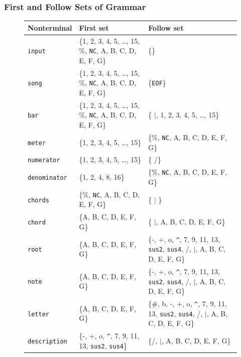 \documentclass{article}
\begin{document}
\subsubsection{First and Follow Sets of Grammar}
\begin{figure}[H]
    \def\arraystretch{1.5}%
    \begin{tabularx}{\textwidth}{l|X|X}
        Nonterminal & First set & Follow set \\
        \hline
        \hline
        \lstinline|input| & \{1, 2, 3, 4, 5, \ldots, 15, \%, \texttt{NC}, A, B, C, D, E, F, G\} & \{\}\\
        \hline
        \lstinline|song| & \{1, 2, 3, 4, 5, \ldots, 15, \%, \texttt{NC}, A, B, C, D, E, F, G\} & \{\texttt{EOF}\}\\
        \hline
        \lstinline|bar| & \{1, 2, 3, 4, 5, \ldots, 15, \%, \texttt{NC}, A, B, C, D, E, F, G\} & \{ $\vert$, 1, 2, 3, 4, 5, \ldots, 15\} \\
        \hline
        \lstinline|meter| &  \{1, 2, 3, 4, 5, \ldots, 15\} 
        & \{\%, \texttt{NC}, A, B, C, D, E, F, G\} \\
        \hline
        \lstinline|numerator| & \{1, 2, 3, 4, 5, \ldots, 15\} 
        & \{ /\}\\
        \hline
        \lstinline|denominator| & \{1, 2, 4, 8, 16\} 
        & \{\%, \texttt{NC}, A, B, C, D, E, F, G\} \\
        \hline
        \lstinline|chords| & \{\%, \texttt{NC}, A, B, C, D, E, F, G\}
        & \{ $\vert$ \} \\
        \hline
        \lstinline|chord| & \{A, B, C, D, E, F, G\}  & 
        \{ $\vert$, A, B, C, D, E, F, G\} \\
        \hline
        \lstinline|root| & \{A, B, C, D, E, F, G\} 
        & \{-, +, o, \lstinline|^|, 7, 9, 11, 13, \texttt{sus2}, \texttt{sus4}, /, $\vert$, A, B, C, D, E, F, G\} \\
        \hline
        \lstinline|note| & \{A, B, C, D, E, F, G\} 
        & \{-, +, o, \lstinline|^|, 7, 9, 11, 13, \texttt{sus2}, \texttt{sus4}, /, $\vert$, A, B, C, D, E, F, G\} \\
        \hline
        \lstinline|letter| & \{A, B, C, D, E, F, G\} 
        & \{\#, b, -, +, o, \lstinline|^|, 7, 9, 11, 13, \texttt{sus2}, \texttt{sus4}, /, $\vert$, A, B, C, D, E, F, G\} \\
        \hline
        \lstinline|description| & \{-, +, o, \lstinline|^|, 7, 9, 11, 13, \texttt{sus2}, \texttt{sus4}\}  & \{/, $\vert$, A, B, C, D, E, F, G\} \\

\end{tabularx}
\end{figure}
\end{document}
